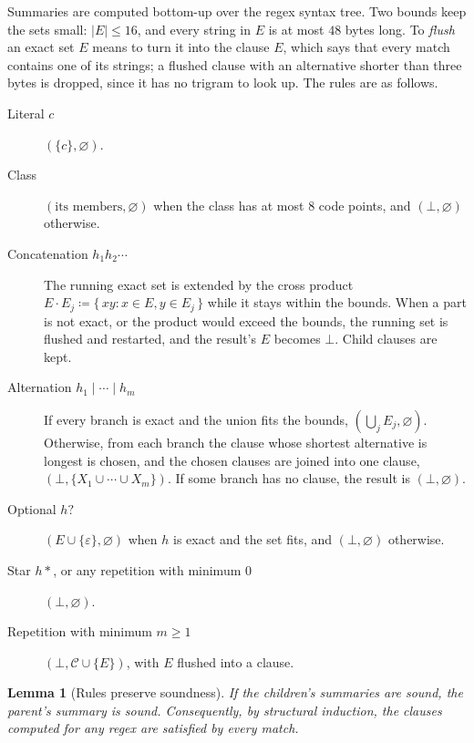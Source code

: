 \documentclass[11pt]{article}
\theoremstyle{plain}
\newtheorem{lemma}[theorem]{Lemma}
\theoremstyle{definition}
\theoremstyle{remark}
\newcommand{\abs}[1]{\left\lvert #1 \right\rvert}
\begin{document}
Summaries are computed bottom-up over the regex syntax tree. Two bounds keep the
sets small: $\abs{E} \le 16$, and every string in $E$ is at most $48$ bytes long.
To \emph{flush} an exact set $E$ means to turn it into the clause $E$, which says
that every match contains one of its strings; a flushed clause with an
alternative shorter than three bytes is dropped, since it has no trigram to look
up. The rules are as follows.
\begin{description}
  \item[Literal $c$] $(\{c\}, \varnothing)$.
  \item[Class] $(\text{its members}, \varnothing)$ when the class has at most
        $8$ code points, and $(\bot, \varnothing)$ otherwise.
  \item[Concatenation $h_1 h_2 \cdots$] The running exact set is extended by
        the cross product $E \cdot E_j \coloneqq \{\, xy : x \in E, y \in E_j \,\}$
        while it stays within the bounds. When a part is not exact, or the product
        would exceed the bounds, the running set is flushed and restarted, and the
        result's $E$ becomes $\bot$. Child clauses are kept.
  \item[Alternation $h_1 \mid \cdots \mid h_m$] If every branch is exact and the
        union fits the bounds, $(\bigcup_j E_j, \varnothing)$. Otherwise, from
        each branch the clause whose shortest alternative is longest is chosen,
        and the chosen clauses are joined into one clause,
        $(\bot, \{X_1 \cup \cdots \cup X_m\})$. If some branch has no clause, the
        result is $(\bot, \varnothing)$.
  \item[Optional $h?$] $(E \cup \{\varepsilon\}, \varnothing)$ when $h$ is exact
        and the set fits, and $(\bot, \varnothing)$ otherwise.
  \item[Star $h*$, or any repetition with minimum $0$] $(\bot, \varnothing)$.
  \item[Repetition with minimum $m \ge 1$] $(\bot, \mathcal{C} \cup \{E\})$,
        with $E$ flushed into a clause.
\end{description}

\begin{lemma}[Rules preserve soundness]\label{lem:rules}
If the children's summaries are sound, the parent's summary is sound.
Consequently, by structural induction, the clauses computed for any regex are
satisfied by every match.
\end{lemma}
\end{document}
